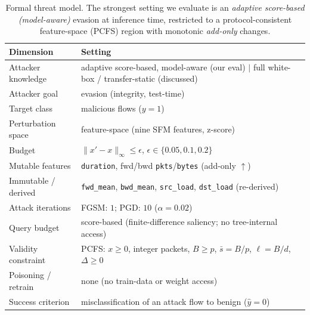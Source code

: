 \documentclass[preprint,12pt,authoryear]{elsarticle}
\begin{document}
\begin{table}[h]
\centering
\caption{Formal threat model. The strongest setting we evaluate is an
\emph{adaptive score-based (model-aware)} evasion at inference time, restricted to a
protocol-consistent feature-space (PCFS) region with monotonic \emph{add-only}
changes.}
\label{tab:threatmodel}
\small
\begin{tabular}{ll}
\toprule
Dimension & Setting \\
\midrule
Attacker knowledge   & adaptive score-based, model-aware (our eval) $\vert$ full white-box / transfer-static (discussed) \\
Attacker goal        & evasion (integrity, test-time) \\
Target class         & malicious flows ($y{=}1$) \\
Perturbation space   & feature-space (nine SFM features, z-score) \\
Budget               & $\lVert x'-x\rVert_\infty \le \epsilon$, $\epsilon\in\{0.05,0.1,0.2\}$ \\
Mutable features     & \texttt{duration}, fwd/bwd \texttt{pkts}/\texttt{bytes} (add-only $\uparrow$) \\
Immutable / derived  & \texttt{fwd\_mean}, \texttt{bwd\_mean}, \texttt{src\_load}, \texttt{dst\_load} (re-derived) \\
Attack iterations    & FGSM: $1$; PGD: $10$ ($\alpha{=}0.02$) \\
Query budget         & score-based (finite-difference saliency; no tree-internal access) \\
Validity constraint  & PCFS: $x\ge0$, integer packets, $B\ge p$, $\bar{s}{=}B/p$, $\ell{=}B/d$, $\Delta\ge0$ \\
Poisoning / retrain  & none (no train-data or weight access) \\
Success criterion    & misclassification of an attack flow to benign ($\hat{y}{=}0$) \\
\bottomrule
\end{tabular}
\end{table}
\end{document}
